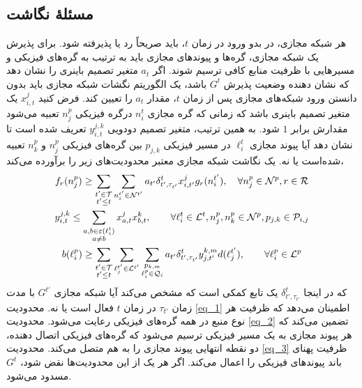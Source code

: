 \subsection{مسئله‌ٔ نگاشت}
هر شبکه مجازی، در بدو ورود در زمان $ t $، باید صریحاً رد یا پذیرفته شود. برای پذیرش یک شبکه مجازی، گره‌ها و پیوندهای مجازی باید به ترتیب به گره‌های فیزیکی و مسیرهایی با ظرفیت منابع کافی ترسیم شوند. اگر $ a_t $ متغیر تصمیم باینری را نشان دهد که نشان دهنده وضعیت پذیرش $ G ^ {t} $ باشد، یک الگوریتم نگشات شبکه مجازی باید بدون دانستن ورود شبکه‌های مجازی پس از زمان $ t $، مقدار $ a_t $ را تعیین کند. فرض کنید $x_{i,t}^{j}$ یک متغیر تصمیم باینری باشد که زمانی که گره مجازی $n_{i}^{t}$ درگره فیزیکی $n_{j}^{p}$ تعبیه می‌شود مقدارش برابر $1$ شود. به همین ترتیب، متغیر تصمیم دودویی $y_{i,t}^{j,k}$ تعریف شده است تا نشان دهد آیا پیوند مجازی $\ell_{i}^{t}$ در مسیر فیزیکی $p_{j,k}$ بین گره‌های فیزیکی $ n_ {j} ^ {p} $ و $ n_ {k} ^ {p} $ تعبیه شده‌است یا نه. یک نگاشت شبکه مجازی معتبر محدودیت‌های زیر را برآورده می‌کند،
\begin{gather}
f_{r}(n_{j}^{p}) 
\ge 
\sum_{\substack{t'\in\mathcal{T}\\t'\le t}}
\sum_{n_{i}^{t'} \in \mathcal{N}^{t'}}
a_{t'}
\delta_{t',\tau_{t'}}^{t}
x_{i,t'}^{j}
g_{r}(n_{i}^{t'}),
\quad
\forall
n_{j}^{p} \in \mathcal{N}^{p},
r\in \mathcal{R} \label{eq_1} \\
y_{i,t}^{j,k} 
\le 
\sum_{\substack{a,b\in\varepsilon(\ell_{i}^{t})\\a\ne b}}
x_{a,t}^{j}
x_{b,t}^{k},
\qquad
\forall 
\ell_{i}^{t} \in \mathcal{L}^{t},
n_{j}^{p},n_{k}^{p}\in\mathcal{N}^{p},
p_{j,k} \in \mathcal{P}_{i,j} \label{eq_2} \\
b(\ell_{i}^{p})
\ge
\sum_{\substack{t'\in\mathcal{T}\\t'\le t}}
\sum_{\ell_{j}^{t'} \in \mathcal{L}^{t'}}
\sum_{\substack{p_{k,m} \\ \ell_{i}^{p}\in \mathcal{Q}_{i}}}
a_{t'}
\delta_{t',\tau_{t'}}^{t}
y_{j,t'}^{k,m}
d(\ell_{j}^{t'}),
\qquad
\forall 
\ell_{i}^{p} \in \mathcal{L}^{p} \label{eq_3}
\end{gather}
که در اینجا $\delta_{t',\tau_{t'}}^{t}$ یک تابع کمکی است که مشخص می‌کند آیا شبکه مجازی $G^{t'}$ با مدت زمان $\tau_{t'}$ در زمان $t$ فعال است یا نه.
محدودیت 
\eqref {eq_1}
 اطمینان می‌دهد که ظرفیت هر نوع منبع در همه گره‌های فیزیکی رعایت می‌شود. محدودیت 
\eqref {eq_2} 
 تضمین می‌کند که هر پیوند مجازی به یک مسیر فیزیکی ترسیم می‌شود که گره‌های فیزیکی اتصال دهنده، دو نقطه انتهایی پیوند مجازی را به هم متصل می‌کند. محدودیت 
 \eqref {eq_3}
  ظرفیت پهنای باند پیوندهای فیزیکی را اعمال می‌کند. اگر هر یک از این محدودیت‌ها نقض شود، $ G ^ {t} $ مسدود می‌شود.
  
